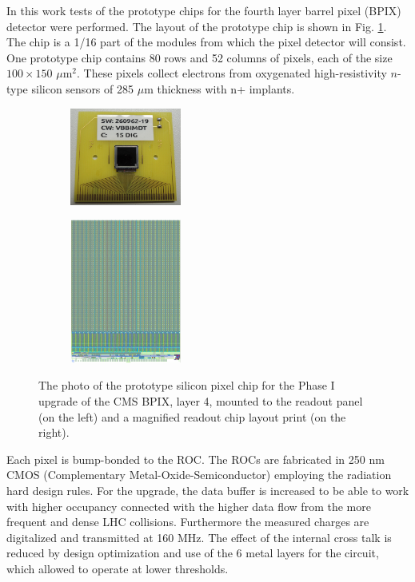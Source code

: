 In this work tests of the prototype chips for the fourth layer barrel pixel (BPIX) detector were performed. The layout of the prototype chip is shown 
in Fig. \ref{fig:prototype}. The chip is a 1/16 part of the modules from which the pixel detector will consist. 
One prototype chip contains 80 rows and 52 columns of pixels, each of the size $100\times150$ $\mu$m$^{2}$.
These pixels collect electrons from oxygenated high-resistivity $n$-type silicon sensors of 285 $\mu$m thickness with n+ implants. 

\begin{figure}[t]
 \centering
 \begin{subfigure}
  \centering
  \includegraphics[width=0.4\textwidth]{021_pixel_upgrade/plots/prototype_chip_photo.png}
 \end{subfigure}
 \begin{subfigure}
  \centering
  \includegraphics[width=0.4\textwidth]{021_pixel_upgrade/plots/prototype_chip.png}
 \end{subfigure}
 \caption{The photo of the prototype silicon pixel chip for the Phase I upgrade of the CMS BPIX, layer 4, mounted to the readout panel (on the left)
 and a magnified readout chip layout print (on the right).}
 \label{fig:prototype}
\end{figure}

Each pixel is bump-bonded to the ROC. The ROCs are fabricated in 250 nm CMOS (Complementary Metal-Oxide-Semiconductor)
employing the radiation hard design rules.
For the upgrade, the data buffer is increased to be able to work with higher occupancy connected with the higher data flow from the more frequent 
and dense LHC collisions. Furthermore the measured charges are digitalized and transmitted at 160 MHz. The effect of the internal cross talk is reduced
by design optimization and use of the 6 metal layers for the circuit, which allowed to operate at lower thresholds.


